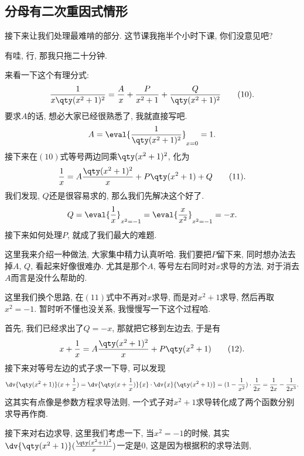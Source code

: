 \documentclass{ctexbook}
\begin{document}
{\subsection{分母有二次重因式情形}
接下来让我们处理最难啃的部分. 这节课我拖半个小时下课, 你们没意见吧? \par
有哇, 行, 那我只拖二十分钟. \par
来看一下这个有理分式: 
\begin{align*}
\frac{1}{x\qty(x^{2}+1)^{2}}=\frac{A}{x}+\frac{P}{x^{2}+1}+\frac{Q}{\qty(x^{2}+1)^{2}}\tag{10}
.\end{align*}
要求$A$的话, 想必大家已经很熟悉了, 我就直接写吧. 
\begin{align*}
A=\eval{\frac{1}{\qty(x^{2}+1)^{2}}}_{x=0}=1
.\end{align*}
接下来在$(10)$式等号两边同乘$\qty(x^{2}+1)^{2}$, 化为
\begin{align*}
\frac{1}{x}=A\frac{\qty(x^{2}+1)^{2}}{x}+P\qty(x^{2}+1)+Q\tag{11}
.\end{align*}
我们发现, $Q$还是很容易求的, 那么我们先解决这个好了. 
\begin{align*}
Q=\eval{\frac{1}{x}}_{x^{2}=-1}=\eval{\frac{x}{x^{2}}}_{x^{2}=-1}=-x
.\end{align*}
接下来如何处理$P$, 就成了我们最大的难题. \par
这里我来介绍一种做法, 大家集中精力认真听哈. 我们要把$P$留下来, 同时想办法去掉$A,\,Q$, 看起来好像很难办. 尤其是那个$A$, 等号左右同时对$x$求导的方法, 对于消去$A$而言是没什么帮助的. \par
这里我们换个思路, 在$(11)$式中不再对$x$求导, 而是对$x^{2}+1$求导, 然后再取$x^{2}=-1$. 暂时听不懂也没关系, 我慢慢写一下这个过程哈. \par
首先, 我们已经求出了$Q=-x$, 那就把它移到左边去, 于是有
\begin{align*}
x+\frac{1}{x}=A\frac{\qty(x^{2}+1)^{2}}{x}+P\qty(x^{2}+1)\tag{12}
.\end{align*}
接下来对等号左边的式子求一下导, 可以发现
\begin{align*}
\dv{\qty(x^{2}+1)}(x+\frac{1}{x})=\dv{\qty(x+\frac{1}{x})}{x}\cdot\dv{x}{\qty(x^{2}+1)}=(1-\frac{1}{x^{2}})\cdot\frac{1}{2x}=\frac{1}{2x}-\frac{1}{2x^{3}}
.\end{align*}
这其实有点像是参数方程求导法则, 一个式子对$x^{2}+1$求导转化成了两个函数分别求导再作商. \par
接下来对右边求导, 这里我们考虑一下, 当$x^{2}=-1$的时候, 其实$\dv{\qty(x^{2}+1)}(\frac{\qty(x^{2}+1)^{2}}{x})$一定是$0$, 这是因为根据积的求导法则, 
\begin{align*}

\end{align*}}
\end{document}
